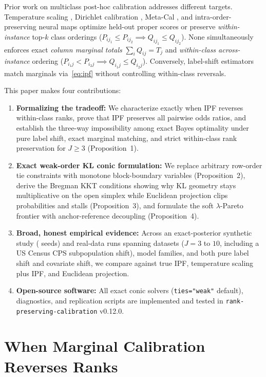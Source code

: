 \documentclass[11pt]{article}
\begin{document}
Prior work on multiclass post-hoc calibration addresses different targets. Temperature scaling \citep{guo2017}, Dirichlet calibration \citep{kull2019}, Meta-Cal \citep{ma2021metacal}, and intra-order-preserving neural maps \citep{rahimi2020} optimize held-out proper scores or preserve \emph{within-instance} top-$k$ class orderings ($P_{i j_1} \le P_{i j_2} \implies Q_{i j_1} \le Q_{i j_2}$). None simultaneously enforces exact \emph{column marginal totals} $\sum_i Q_{ij} = T_j$ and \emph{within-class across-instance} ordering ($P_{i_1 j} < P_{i_2 j} \implies Q_{i_1 j} \le Q_{i_2 j}$). Conversely, label-shift estimators \citep{saerens2002,lipton2018} match marginals via~\eqref{eq:ipf} without controlling within-class reversals.

This paper makes four contributions:
\begin{enumerate}[leftmargin=*,itemsep=2pt]
\item \textbf{Formalizing the tradeoff:} We characterize exactly when IPF reverses within-class ranks, prove that IPF preserves all pairwise odds ratios, and establish the three-way impossibility among exact Bayes optimality under pure label shift, exact marginal matching, and strict within-class rank preservation for $J \ge 3$ (Proposition~1).
\item \textbf{Exact weak-order KL conic formulation:} We replace arbitrary row-order tie constraints with monotone block-boundary variables (Proposition~2), derive the Bregman KKT conditions showing why KL geometry stays multiplicative on the open simplex while Euclidean projection clips probabilities and stalls (Proposition~3), and formulate the soft $\lambda$-Pareto frontier with anchor-reference decoupling (Proposition~4).
\item \textbf{Broad, honest empirical evidence:} Across an exact-posterior synthetic study (\NumSynthSeeds{} seeds) and \NumTotalRealRuns{} real-data runs spanning \NumDatasets{} datasets ($J=3$ to $10$, including a US Census CPS subpopulation shift), \NumModels{} model families, and both pure label shift and covariate shift, we compare against true IPF, temperature scaling plus IPF, and Euclidean projection.
\item \textbf{Open-source software:} All exact conic solvers (\texttt{ties="weak"} default), diagnostics, and replication scripts are implemented and tested in \texttt{rank-preserving-calibration} v0.12.0.
\end{enumerate}

\section{When Marginal Calibration Reverses Ranks}
\end{document}
